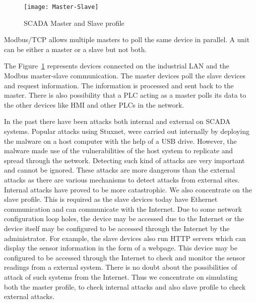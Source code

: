 \documentclass[article,msc=informatik,type=msc,colorback,accentcolor=tud9c]{tudthesis}
\begin{document}
 	\begin{figure}[h]
        \centering
        \texttt{[image: Master-Slave]}
        \caption[SCADA Master and Slave profile]{\label{f:SCADA Master and Slave}SCADA Master and Slave profile }
        \end{figure}
        
        
        Modbus/TCP allows multiple masters to poll the same device in parallel. A unit can be either a master or a slave but not both. 
        
 	The Figure~\ref{f:SCADA Master and Slave} represents devices connected on the industrial LAN and the Modbus master-slave communication. The master devices poll the slave devices and request information. The information is processed and sent back to the master. There is also possibility that a \ac{PLC} acting as a master polls its data to the other devices like \ac{HMI} and other \ac{PLC}s in the network. 


	\vspace{3mm}
	In the past there have been attacks both internal and external on \ac{SCADA} systems. Popular attacks using Stuxnet, were carried out internally by deploying the malware on a host computer with the help of a USB drive. However, the malware made use of the vulnerabilities of the host system to replicate and spread through the network. Detecting such kind of attacks are very important and cannot be ignored. These attacks are more dangerous than the external attacks as there are various mechanisms to detect attacks from external sites. Internal attacks have proved to be more catastrophic. We also concentrate on the slave profile. This is required as the slave devices today have Ethernet communication and can communicate with the Internet. Due to some network configuration loop holes, the device may be accessed due to the Internet or the device itself may be configured to be accessed through the Internet by the administrator. For example, the slave devices also run HTTP servers which can display the sensor information in the form of a webpage. This device may be configured to be accessed through the Internet to check and monitor the sensor readings from a external system. There is no doubt about the possibilities of attack of such systems from the Internet. Thus we concentrate on simulating both the master profile, to check internal attacks and also slave profile to check external attacks. 
	
\end{document}
